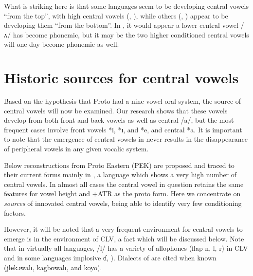 \documentclass[output=paper,newtxmath,modfonts,nonflat]{langsci/langscibook}
\begin{document}
What is striking here is that some languages seem to be developing central vowels “from the top”, with high central vowels (,  ), while others (, ) appear to be developing them “from the bottom”.  In , it would appear a lower central vowel /ʌ/ has become phonemic, but it may be the two higher conditioned central vowels will one day become phonemic as well. 

\section{Historic sources for central vowels}\label{sec:zogbo:3}

Based on the hypothesis that Proto  had a nine vowel oral system, the source of central vowels will now be examined.  Our research shows that these vowels develop from both front and back vowels as well as central /a/, but the most frequent cases involve front vowels *i, *ɪ, and *e, and central *a.  It is important to note that the emergence of central vowels in  never results in the disappearance of peripheral vowels in any given vocalic system.  

Below reconstructions from Proto Eastern  (PEK) are proposed and traced to their current forms mainly in , a language which shows a very high number of central vowels.  In almost all cases the central vowel in question retains the same features for vowel height and +ATR as the proto form.  Here we concentrate on \textit{sources} of innovated central vowels, being able to identify very few conditioning factors. 

However, it will be noted that a very frequent environment for central vowels to emerge is in the environment of CLV, a fact which will be discussed below.  Note that in virtually all  languages, /l/ has a variety of allophones (flap n, l, r) in CLV and in some languages implosive ɗ, \citealt{Marchese1979/1983}). Dialects of  are cited when known (jlʉkɔwalɪ, kagbʊwalɪ, and koyo).
\end{document}
